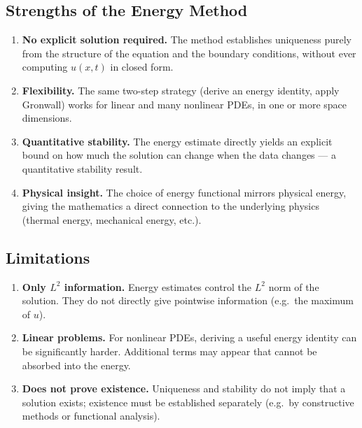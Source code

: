 \documentclass[12pt,a4paper]{article}
\theoremstyle{plain}
\theoremstyle{definition}
\begin{document}
\subsection{Strengths of the Energy Method}

\begin{enumerate}[label=\textbf{\arabic*.}]
  \item \textbf{No explicit solution required.}
        The method establishes uniqueness purely from the structure of the equation
        and the boundary conditions, without ever computing $u(x,t)$ in closed form.
  \item \textbf{Flexibility.}
        The same two-step strategy (derive an energy identity, apply Gronwall) works
        for linear and many nonlinear PDEs, in one or more space dimensions.
  \item \textbf{Quantitative stability.}
        The energy estimate directly yields an explicit bound on how much the
        solution can change when the data changes — a quantitative stability
        result.
  \item \textbf{Physical insight.}
        The choice of energy functional mirrors physical energy, giving the
        mathematics a direct connection to the underlying physics (thermal energy,
        mechanical energy, etc.).
\end{enumerate}

\subsection{Limitations}

\begin{enumerate}[label=\textbf{\arabic*.}]
  \item \textbf{Only $L^2$ information.}
        Energy estimates control the $L^2$ norm of the solution. They do not
        directly give pointwise information (e.g.\ the maximum of $u$).
  \item \textbf{Linear problems.}
        For nonlinear PDEs, deriving a useful energy identity can be significantly
        harder. Additional terms may appear that cannot be absorbed into the energy.
  \item \textbf{Does not prove existence.}
        Uniqueness and stability do not imply that a solution exists; existence
        must be established separately (e.g.\ by constructive methods or functional
        analysis).
\end{enumerate}


\end{document}
